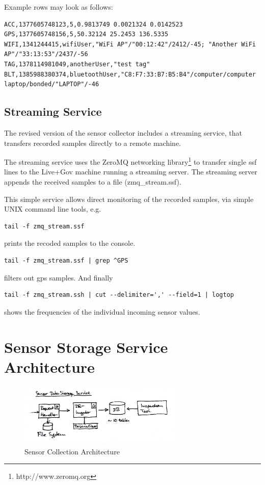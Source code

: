 Example rows may look as follows:
\small
\begin{verbatim}
ACC,1377605748123,5,0.9813749 0.0021324 0.0142523
GPS,1377605748156,5,50.32124 25.2453 136.5335
WIFI,1341244415,wifiUser,"WiFi AP"/"00:12:42"/2412/-45; "Another WiFi AP"/"33:13:53"/2437/-56
TAG,1378114981049,anotherUser,"test tag"
BLT,1385988380374,bluetoothUser,"C8:F7:33:B7:B5:B4"/computer/computer laptop/bonded/"LAPTOP"/-46
\end{verbatim}
\normalsize

\subsection{Streaming Service}

The revised version of the sensor collector includes a streaming
service, that transfers recorded samples directly to a remote machine.

The streaming service uses the ZeroMQ networking
library\footnote{http://www.zeromq.org} to transfer single ssf lines
to the Live+Gov machine running a streaming server. The streaming
server appends the received samples to a file (zmq\_stream.ssf).

This simple service allows direct monitoring of the recorded samples,
via simple UNIX command line tools, e.g. 
\begin{verbatim} 
tail -f zmq_stream.ssf 
\end{verbatim}
prints the recoded samples to the console.
\begin{verbatim} 
tail -f zmq_stream.ssf | grep ^GPS 
\end{verbatim} 
filters out gps samples. And finally
\begin{verbatim} 
tail -f zmq_stream.ssh | cut --delimiter=',' --field=1 | logtop  
\end{verbatim}

shows the frequencies of the individual incoming sensor values.

\section{Sensor Storage Service Architecture}

\begin{figure}[htbp]
\centering
\includegraphics[width=0.7\textwidth]{img/sc/ss_architecture.jpg}
\caption{Sensor Collection Architecture}\label{fig:ss_architecture}
\end{figure}

